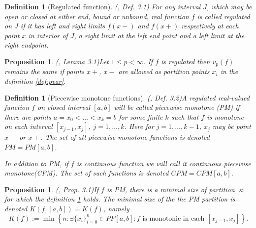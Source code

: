 \documentclass[12pt, a4paper]{article}
\newtheorem{proposition}[theorem]{Proposition}
\newtheorem{definition}[theorem]{Definition}
\numberwithin{equation}{section}
\begin{document}
 

\begin{definition}[Regulated function](\cite{Qian}, Def. 3.1)
  For any interval $J$, which may be open or closed at either end, bound or unbound, 
  real function $f$ is called \emph{regulated} on $J$ if it has left and right limits   
  $f(x-)$ and $f(x+)$ respectively at each point $x$ in interior of $J$,
  a right limit at the left end point and a left limit at the right endpoint.
\end{definition}  
 
\begin{proposition}(\cite{Qian}, Lemma 3.1)\label{prop:LimPoints} 
  Let $1 \leq p < \infty$. If $f$ is regulated then $v_{p}(f)$ remains the same
  if points $x+$, $x-$ are allowed as partition points $x_i$ in the definition \ref{def:pvar}.
\end{proposition}  
 
\begin{definition}[Piecewise monotone functions](\cite{Qian}, Def. 3.2)\label{def:PM}
  A regulated real-valued function $f$ on closed interval $[a,b]$ 
  will be called \emph{piecewise monotone} (PM)
  if there are points $a=x_0<\dots<x_k=b$ for some finite $k$ such 
  that $f$ is monotone on each interval $[x_{j-1},x_j],\;j=1,\dots,k$. 
  Here for $j=1,\dots,k-1$, $x_j$ may be point $x-$ or $x+$.
  The set of all piecewise monotone functions is denoted $PM=PM[a,b]$.
  
  In addition to PM, if $f$ is continuous function we will call it 
  continuous piecewise monotone(CPM). 
  The set of such functions is denoted $CPM=CPM[a,b]$. 
\end{definition}   


 
\begin{proposition}(\cite{Qian}, Prop. 3.1)\label{prop:K_f}
  If $f$ is PM, there is a minimal size of partition $|\kappa|$ for which the definition \ref{def:PM} holds.
  The minimal size of the the PM partition is denoted $K(f,[a,b])=K(f)$, namely
  \begin{equation}
  K(f):=\min\left\{n:\exists \{x_{i}\}_{i=0}^{n} \in PP[a,b]:  f \text{ is monotonic in each } [x_{j-1}, x_j]   \right\}.
  \end{equation}
\end{proposition}    
 
\end{document}
